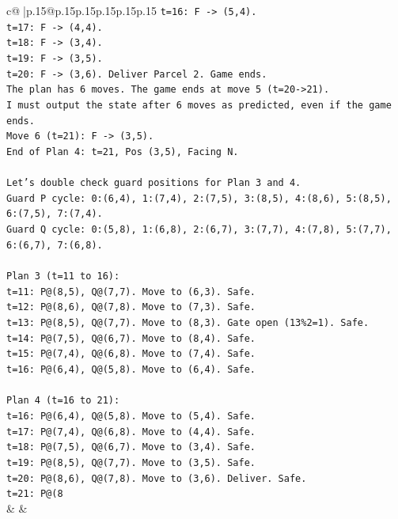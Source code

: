 \documentclass{article}
\begin{document}
{\begin{supertabular}{c@{$\;$}|p{.15\linewidth}@{}p{.15\linewidth}p{.15\linewidth}p{.15\linewidth}p{.15\linewidth}p{.15\linewidth}}
{{{\texttt{t=16: F {-}> (5,4).} \\
\texttt{t=17: F {-}> (4,4).} \\
\texttt{t=18: F {-}> (3,4).} \\
\texttt{t=19: F {-}> (3,5).} \\
\texttt{t=20: F {-}> (3,6). Deliver Parcel 2. Game ends.} \\
\texttt{The plan has 6 moves. The game ends at move 5 (t=20{-}>21).} \\
\texttt{I must output the state after 6 moves as predicted, even if the game ends.} \\
\texttt{Move 6 (t=21): F {-}> (3,5).} \\
\texttt{End of Plan 4: t=21, Pos (3,5), Facing N.} \\
\\ 
\texttt{Let's double check guard positions for Plan 3 and 4.} \\
\texttt{Guard P cycle: 0:(6,4), 1:(7,4), 2:(7,5), 3:(8,5), 4:(8,6), 5:(8,5), 6:(7,5), 7:(7,4).} \\
\texttt{Guard Q cycle: 0:(5,8), 1:(6,8), 2:(6,7), 3:(7,7), 4:(7,8), 5:(7,7), 6:(6,7), 7:(6,8).} \\
\\ 
\texttt{Plan 3 (t=11 to 16):} \\
\texttt{t=11: P@(8,5), Q@(7,7). Move to (6,3). Safe.} \\
\texttt{t=12: P@(8,6), Q@(7,8). Move to (7,3). Safe.} \\
\texttt{t=13: P@(8,5), Q@(7,7). Move to (8,3). Gate open (13\%2=1). Safe.} \\
\texttt{t=14: P@(7,5), Q@(6,7). Move to (8,4). Safe.} \\
\texttt{t=15: P@(7,4), Q@(6,8). Move to (7,4). Safe.} \\
\texttt{t=16: P@(6,4), Q@(5,8). Move to (6,4). Safe.} \\
\\ 
\texttt{Plan 4 (t=16 to 21):} \\
\texttt{t=16: P@(6,4), Q@(5,8). Move to (5,4). Safe.} \\
\texttt{t=17: P@(7,4), Q@(6,8). Move to (4,4). Safe.} \\
\texttt{t=18: P@(7,5), Q@(6,7). Move to (3,4). Safe.} \\
\texttt{t=19: P@(8,5), Q@(7,7). Move to (3,5). Safe.} \\
\texttt{t=20: P@(8,6), Q@(7,8). Move to (3,6). Deliver. Safe.} \\
\texttt{t=21: P@(8} \\
            }
        }
    }
    & & \\ \\


\end{supertabular}}
\end{document}
